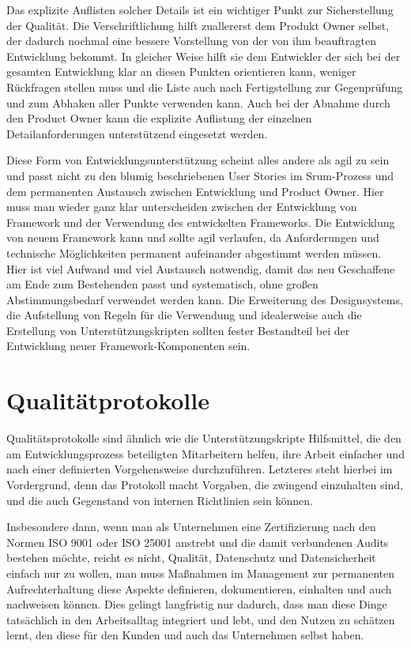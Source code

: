 Das explizite Auflisten solcher Details ist ein wichtiger Punkt zur Sicherstellung der Qualität. Die Verschriftlichung hilft zuallererst dem Produkt Owner selbst, der dadurch nochmal eine bessere Vorstellung von der von ihm beauftragten Entwicklung bekommt. In gleicher Weise hilft sie dem Entwickler der sich bei der gesamten Entwicklung klar an diesen Punkten orientieren kann, weniger Rückfragen stellen muss und die Liste auch nach Fertigstellung zur Gegenprüfung und zum Abhaken aller Punkte verwenden kann. Auch bei der Abnahme durch den Product Owner kann die explizite Auf\-listung der einzelnen Detailanforderungen unterstützend eingesetzt werden.

Diese Form von Entwicklungsunterstützung scheint alles andere als agil zu sein und passt nicht zu den blumig beschriebenen User Stories im Srum-Prozess und dem permanenten Austausch zwischen Entwicklung und Product Owner. Hier muss man wieder ganz klar unterscheiden zwischen der Entwicklung von Framework und der Verwendung des entwickelten Frameworks. Die Entwicklung von neuem Framework kann und sollte agil verlaufen, da Anforderungen und technische Möglichkeiten permanent aufeinander abgestimmt werden müssen. Hier ist viel Aufwand und viel Austausch notwendig, damit das neu Geschaffene am Ende zum Bestehenden passt und systematisch, ohne großen Abstimmungsbedarf verwendet werden kann. Die Erweiterung des Designsystems, die Aufstellung von Regeln für die Verwendung und idealerweise auch die Erstellung von Unterstützungskripten sollten fester Bestandteil bei der Entwicklung neuer Framework-Komponenten sein.

\section{Qualitätprotokolle}
Qualitätsprotokolle sind ähnlich wie die Unterstützungskripte Hilfsmittel, die den am Entwicklungsprozess beteiligten Mitarbeitern helfen, ihre Arbeit einfacher und nach einer definierten Vorgehensweise durchzuführen. Letzteres steht hierbei im Vordergrund, denn das Protokoll macht Vorgaben, die zwingend einzuhalten sind, und die auch Gegenstand von internen Richtlinien sein können.

Insbesondere dann, wenn man als Unternehmen eine Zertifizierung nach den Normen ISO 9001 oder ISO 25001 anstrebt und die damit verbundenen Audits bestehen möchte, reicht es nicht, Qualität, Datenschutz und Datensicherheit einfach nur zu wollen, man muss Maßnahmen im Management zur permanenten Aufrechterhaltung diese Aspekte definieren, dokumentieren, einhalten und auch nachweisen können. Dies gelingt langfristig nur dadurch, dass man diese Dinge tatsächlich in den Arbeitsalltag integriert und lebt, und den Nutzen zu schätzen lernt, den diese für den Kunden und auch das Unternehmen selbst haben. 

